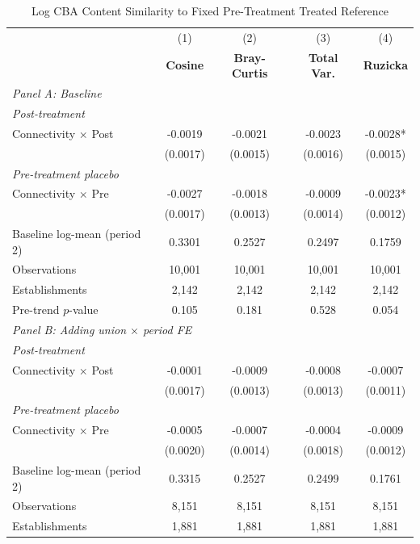 \begin{table}[H]
\centering
\caption{Log CBA Content Similarity to Fixed Pre-Treatment Treated Reference}
\label{tab:pretreat_ref_ln_cba_similarity}
\scriptsize
\setlength{\tabcolsep}{8pt}
\begin{tabular}{lcccc}
\hline\hline
 & (1) & (2) & (3) & (4) \\
 & \textbf{Cosine} & \textbf{Bray-Curtis} & \textbf{Total Var.} & \textbf{Ruzicka} \\
\hline
\multicolumn{5}{l}{\textit{Panel A: Baseline}} \\
\multicolumn{5}{l}{\textit{Post-treatment}} \\
Connectivity $\times$ Post & -0.0019 & -0.0021 & -0.0023 & -0.0028* \\
 & (0.0017) & (0.0015) & (0.0016) & (0.0015) \\
\multicolumn{5}{l}{\textit{Pre-treatment placebo}} \\
Connectivity $\times$ Pre & -0.0027 & -0.0018 & -0.0009 & -0.0023* \\
 & (0.0017) & (0.0013) & (0.0014) & (0.0012) \\
\hline
Baseline log-mean (period 2) & 0.3301 & 0.2527 & 0.2497 & 0.1759 \\
Observations &       10,001 &       10,001 &       10,001 &       10,001 \\
Establishments &        2,142 &        2,142 &        2,142 &        2,142 \\
Pre-trend $p$-value & 0.105 & 0.181 & 0.528 & 0.054 \\
\hline
\multicolumn{5}{l}{\textit{Panel B: Adding union $\times$ period FE}} \\
\multicolumn{5}{l}{\textit{Post-treatment}} \\
Connectivity $\times$ Post & -0.0001 & -0.0009 & -0.0008 & -0.0007 \\
 & (0.0017) & (0.0013) & (0.0013) & (0.0011) \\
\multicolumn{5}{l}{\textit{Pre-treatment placebo}} \\
Connectivity $\times$ Pre & -0.0005 & -0.0007 & -0.0004 & -0.0009 \\
 & (0.0020) & (0.0014) & (0.0018) & (0.0012) \\
\hline
Baseline log-mean (period 2) & 0.3315 & 0.2527 & 0.2499 & 0.1761 \\
Observations &        8,151 &        8,151 &        8,151 &        8,151 \\
Establishments &        1,881 &        1,881 &        1,881 &        1,881 \\

\end{tabular}
\end{table}
